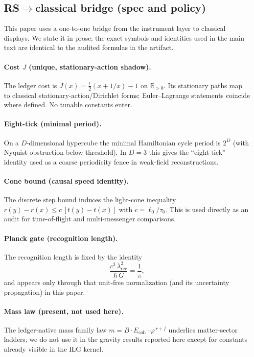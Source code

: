 \documentclass[12pt,a4paper]{article}
\begin{document}
\subsection{RS$\to$classical bridge (spec and policy)}
This paper uses a one-to-one bridge from the instrument layer to classical displays. We state it in prose; the exact symbols and identities used in the main text are identical to the audited formulas in the artifact.

\paragraph{Cost $J$ (unique, stationary-action shadow).}
The ledger cost is \(J(x)=\tfrac12(x+1/x)-1\) on \(\mathbb{R}_{>0}\). Its stationary paths map to classical stationary-action/Dirichlet forms; Euler–Lagrange statements coincide where defined. No tunable constants enter.

\paragraph{Eight-tick (minimal period).}
On a \(D\)-dimensional hypercube the minimal Hamiltonian cycle period is \(2^D\) (with Nyquist obstruction below threshold). In \(D=3\) this gives the “eight-tick” identity used as a coarse periodicity fence in weak-field reconstructions.

\paragraph{Cone bound (causal speed identity).}
The discrete step bound induces the light-cone inequality \(r(y)-r(x)\le c\,[t(y)-t(x)]\) with \(c=\ell_0/\tau_0\). This is used directly as an audit for time-of-flight and multi-messenger comparisons.

\paragraph{Planck gate (recognition length).}
The recognition length is fixed by the identity
\[
\frac{c^3\,\lambda_{\mathrm{rec}}^2}{\hbar\,G}=\frac{1}{\pi},
\]
and appears only through that unit-free normalization (and its uncertainty propagation) in this paper.

\paragraph{Mass law (present, not used here).}
The ledger-native mass family law \(m=B\cdot E_{\mathrm{coh}}\cdot \varphi^{\,r+f}\) underlies matter-sector ladders; we do not use it in the gravity results reported here except for constants already visible in the ILG kernel.
\end{document}

